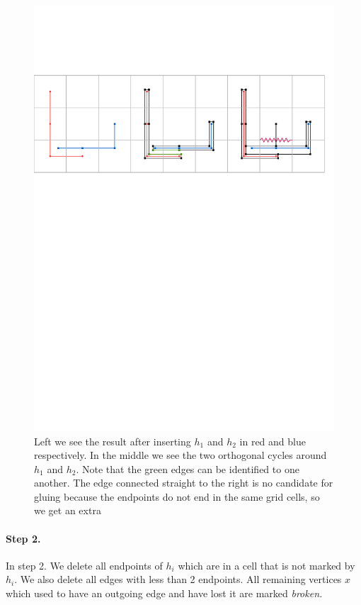 \documentclass{paper}
\begin{document}
{\begin{figure}[H]
\centering
\includegraphics[page = 1]{Figures/cycle.pdf}
\caption{Left we see the result after inserting $h_1$ and $h_2$ in red and blue respectively. In the middle we see the two orthogonal cycles around $h_1$ and $h_2$. Note that the green edges can be identified to one another. The edge connected straight to the right is no candidate for gluing because the endpoints do not end in the same grid cells, so we get an extra }
\label{fig:cycle}
\end{figure}

\paragraph*{Step 2.}

In step 2. We delete all endpoints of $h_i$ which are in a cell that is not marked by $h_i$. We also delete all edges with less than 2 endpoints. All remaining vertices $x$ which used to have an outgoing edge and have lost it are marked \emph{broken.}

}
\end{document}
